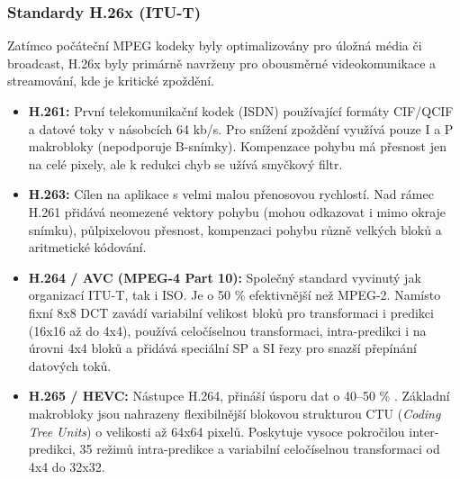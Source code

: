     \subsubsection{Standardy H.26x (ITU-T)}
        Zatímco počáteční MPEG kodeky byly optimalizovány pro úložná média či broadcast, H.26x byly primárně navrženy pro obousměrné videokomunikace a streamování, kde je kritické zpoždění.
        \begin{itemize}
            \item \textbf{H.261:} První telekomunikační kodek (ISDN) používající formáty CIF/QCIF a datové toky v násobcích 64 kb/s. Pro snížení zpoždění využívá pouze I a P makrobloky (nepodporuje B-snímky). Kompenzace pohybu má přesnost jen na celé pixely, ale k redukci chyb se užívá smyčkový filtr.
            \item \textbf{H.263:} Cílen na aplikace s velmi malou přenosovou rychlostí. Nad rámec H.261 přidává neomezené vektory pohybu (mohou odkazovat i mimo okraje snímku), půlpixelovou přesnost, kompenzaci pohybu různě velkých bloků a aritmetické kódování.
            \item \textbf{H.264 / AVC (MPEG-4 Part 10):} Společný standard vyvinutý jak organizací ITU-T, tak i ISO. Je o 50 \% efektivnější než MPEG-2. Namísto fixní 8x8 DCT zavádí variabilní velikost bloků pro transformaci i predikci (16x16 až do 4x4), používá celočíselnou transformaci, intra-predikci i na úrovni 4x4 bloků a přidává speciální SP a SI řezy pro snazší přepínání datových toků.
            \item \textbf{H.265 / HEVC:} Nástupce H.264, přináší úsporu dat o 40--50 \% . Základní makrobloky jsou nahrazeny flexibilnější blokovou strukturou CTU (\textit{Coding Tree Units}) o velikosti až 64x64 pixelů. Poskytuje vysoce pokročilou inter-predikci, 35 režimů intra-predikce a variabilní celočíselnou transformaci od 4x4 do 32x32.
        \end{itemize}